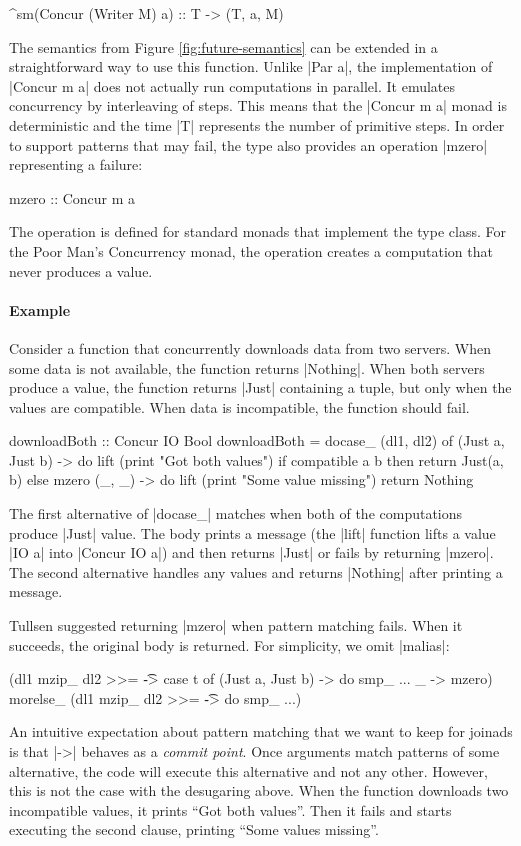 \documentclass{sigplanconf}
\begin{document}
\begin{code}
^sm(Concur (Writer M) a) :: T -> (T, a, M)
\end{code}
The semantics from Figure \ref{fig:future-semantics} can be extended in a straightforward way to use
this function. Unlike |Par a|, the implementation of |Concur m a| does not actually run computations in 
parallel. It emulates concurrency by interleaving of steps. This means that the |Concur m a| monad is 
deterministic and the time |T| represents the number of primitive steps. In order to support patterns 
that may fail, the type also provides an operation |mzero| representing a failure:

\begin{code}
mzero :: Concur m a
\end{code}
The operation is defined for standard monads that implement the  type class. For the
Poor Man's Concurrency monad, the operation creates a computation that never produces a value.

\paragraph{Example} Consider a function that concurrently downloads data from two servers. When some
data is not available, the function returns |Nothing|. When both servers produce a value, the function
returns |Just| containing a tuple, but only when the values are compatible. When data is incompatible,
the function should fail.

\begin{code}
downloadBoth :: Concur IO Bool
downloadBoth = docase_ (dl1, dl2) of
  (Just a, Just b) -> do
    lift (print "Got both values")
    if compatible a b then return Just(a, b) else mzero
  (_, _) -> do
    lift (print "Some value missing")
    return Nothing
\end{code}
The first alternative of |docase_| matches when both of the computations produce |Just| value.
The body prints a message (the |lift| function lifts a value |IO a| into |Concur IO a|) and then 
returns |Just| or fails by returning |mzero|. The second alternative handles any values and returns 
|Nothing| after printing a message.

Tullsen \cite{firstlcasspats} suggested returning |mzero| when pattern matching fails. When it 
succeeds, the original body is returned. For simplicity, we omit |malias|:

\begin{code}
(dl1 mzip_ dl2 >>= \t -> case t of 
    (Just a, Just b) -> do smp_ ...
    _ -> mzero) morelse_
(dl1 mzip_ dl2 >>= \t -> do smp_ ...)
\end{code}
An intuitive expectation about pattern matching that we want to keep for joinads is that 
|->| behaves as a \textit{commit point}. Once arguments match patterns of some alternative, the 
code will execute this alternative and not any other. However, this is not the case with the
desugaring above. When the function downloads two incompatible values, it prints ``Got both values''.
Then it fails and starts executing the second clause, printing ``Some values missing''.
\end{document}
